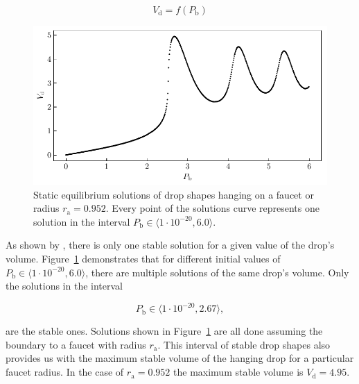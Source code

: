     \begin{equation}
        V_{\mathrm{d}} = f(P_{\mathrm{b}}) 
    \end{equation}

    \begin{figure}[H]
    \begin{center}
        \includegraphics[width=1.0\columnwidth]{img/plot_drop_equilibrium_faucet_pv.pdf}
    \end{center}
        \caption{Static equilibrium solutions of drop shapes hanging on a faucet or radius $r_{\mathrm{a}} = 0.952$. Every point of the solutions curve represents one solution in the interval $P_{\mathrm{b}} \in \langle 1 \cdot 10^{-20}, 6.0 \rangle$.} 
    \label{fig:plot_drop_equilibrium_faucet_pv}
    \end{figure}
        

    As shown by \citep{padday1973}, there is only one stable solution for a given value of the drop's volume. Figure~\ref{fig:plot_drop_equilibrium_faucet_pv} demonstrates that for different initial values of $P_{\mathrm{b}} \in \langle 1 \cdot 10^{-20}, 6.0 \rangle$, there are multiple solutions of the same drop's volume. Only the solutions in the interval

    \begin{equation}
        P_{\mathrm{b}} \in \langle 1 \cdot 10^{-20}, 2.67 \rangle,
    \end{equation}

    are the stable ones. Solutions shown in Figure~\ref{fig:plot_drop_equilibrium_faucet_pv} are all done assuming the boundary to a faucet with radius $r_{\mathrm{a}}$. This interval of stable drop shapes also provides us with the maximum stable volume of the hanging drop for a particular faucet radius. In the case of $r_{\mathrm{a}} = 0.952$ the maximum stable volume is $V_{\mathrm{d}} = 4.95$.

